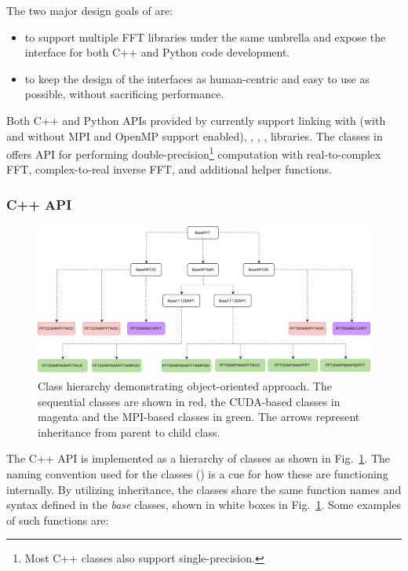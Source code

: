 The two major design goals of  are:
\begin{itemize}
 \item to support multiple FFT libraries under the same umbrella and expose the
 interface for both C++ and Python code development.
 \item to keep the design of the interfaces as human-centric and easy to use as
 possible, without sacrificing performance.
\end{itemize}

Both C++ and Python APIs provided by  currently support linking
with  (with and without MPI and OpenMP support enabled),
, , ,  libraries. The
classes in  offers API for performing
double-precision\footnote{Most C++ classes also support single-precision.}
computation with real-to-complex FFT, complex-to-real inverse FFT, and additional
helper functions.

\subsubsection{C++ API}

\begin{figure}[htp]
  \centering
  \includegraphics[width=\linewidth]{Pyfig/fig_classes}
  \caption{Class hierarchy demonstrating object-oriented approach. The
    sequential classes are shown in red, the CUDA-based classes in magenta and
    the MPI-based classes in green. The arrows represent inheritance from
    parent to child class.
  }\label{fig:classes}
\end{figure}

The C++ API is implemented as a hierarchy of classes as shown in
Fig.~\ref{fig:classes}.
%
The naming convention used for the classes () is a cue for how these are functioning internally.
%
By utilizing inheritance, the classes share the same function names and syntax
defined in the \emph{base} classes, shown in white boxes in
Fig.~\ref{fig:classes}. Some examples of such functions are:

